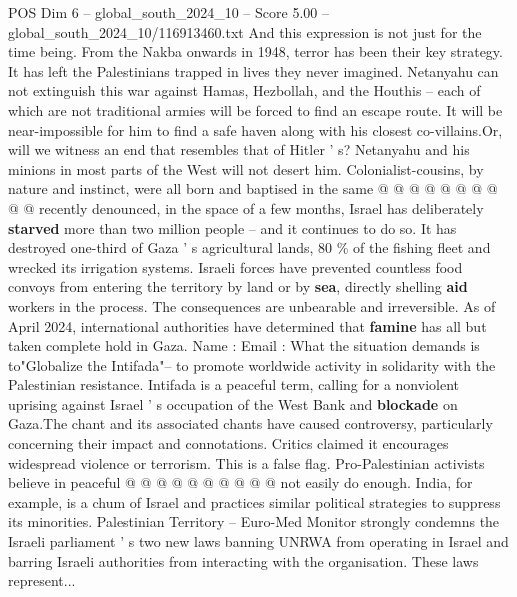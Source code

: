 \begin{textsample}{POS Dim 6 – global\_south\_2024\_10 – Score 5.00 – global\_south\_2024\_10/116913460.txt}
And this expression is not just for the time being.
From the Nakba onwards in 1948, terror has been their key strategy.
It has left the Palestinians trapped in lives they never imagined.
Netanyahu can not extinguish this war against Hamas, Hezbollah, and the Houthis -- each of which are not traditional armies will be forced to find an escape route.
It will be near-impossible for him to find a safe haven along with his closest co-villains.Or, will we witness an end that resembles that of Hitler ' s?
Netanyahu and his minions in most parts of the West will not desert him.
Colonialist-cousins, by nature and instinct, were all born and baptised in the same @ @ @ @ @ @ @ @ @ @ recently denounced, in the space of a few months, Israel has deliberately \textbf{starved} more than two million people -- and it continues to do so.
It has destroyed one-third of Gaza ' s agricultural lands, 80 \% of the fishing fleet and wrecked its irrigation systems.
Israeli forces have prevented countless food convoys from entering the territory by land or by \textbf{sea}, directly shelling \textbf{aid} workers in the process.
The consequences are unbearable and irreversible.
As of April 2024, international authorities have determined that \textbf{famine} has all but taken complete hold in Gaza.
Name : Email : What the situation demands is to"Globalize the Intifada"-- to promote worldwide activity in solidarity with the Palestinian resistance.
Intifada is a peaceful term, calling for a nonviolent uprising against Israel ' s occupation of the West Bank and \textbf{blockade} on Gaza.The chant and its associated chants have caused controversy, particularly concerning their impact and connotations.
Critics claimed it encourages widespread violence or terrorism.
This is a false flag.
Pro-Palestinian activists believe in peaceful @ @ @ @ @ @ @ @ @ @ not easily do enough.
India, for example, is a chum of Israel and practices similar political strategies to suppress its minorities.
Palestinian Territory -- Euro-Med Monitor strongly condemns the Israeli parliament ' s two new laws banning UNRWA from operating in Israel and barring Israeli authorities from interacting with the organisation.
These laws represent...

\end{textsample}
